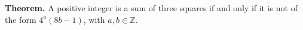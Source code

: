 \textbf{Theorem.} A positive integer is a sum of three squares if and only if it is not of the form $4^a(8b - 1)$, with $a, b \in \mathbb{Z}$.
